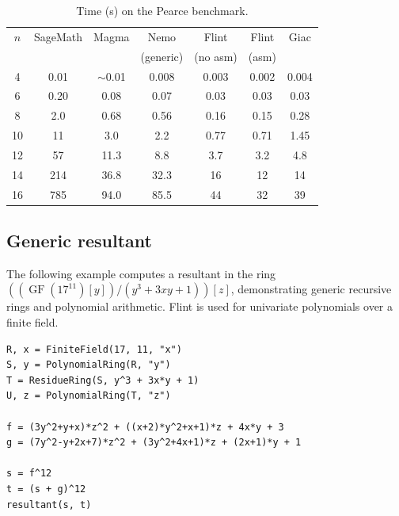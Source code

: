 \documentclass{sig-alternate-05-2015}
\begin{document}
\begin{table}
\center
\caption{Time (s) on the Pearce benchmark.}
\begin{small}
\setlength{\tabcolsep}{2.0pt}
\renewcommand{\arraystretch}{1.08}
\begin{tabular}{c c c c c c c} \hline
$n$ & SageMath & Magma & Nemo & Flint & Flint & Giac \\ 
    &          &       & (generic) & (no asm) & (asm) & \\ \hline
     4  &   0.01 & $\sim$0.01  &   0.008          & 0.003         &   0.002             &                     0.004 \\
     6  &   0.20  &   0.08   &     0.07        &     0.03       &       0.03         &                           0.03 \\
     8  &   2.0  &     0.68   &     0.56       &      0.16      &        0.15        &                            0.28 \\
    10  &   11   &     3.0    &       2.2      &       0.77     &         0.71       &                             1.45 \\
    12  &   57   &    11.3    &      8.8       &        3.7     &           3.2      &                                4.8 \\
    14  &  214   &   36.8     &   32.3         &       16       &         12         &                               14 \\
    16  &  785   &   94.0     &   85.5         &       44       &         32         &                               39 \\
\end{tabular}
\label{tab:pearce}
\end{small}
\end{table}

\subsection{Generic resultant}

The following example computes a resultant
in the ring $((\operatorname{GF}(17^{11})[y])/(y^3 + 3xy + 1))[z]$,
demonstrating generic recursive rings and polynomial
arithmetic. Flint is used for univariate polynomials over a finite field.

\begin{small}
\begin{verbatim}
R, x = FiniteField(17, 11, "x")
S, y = PolynomialRing(R, "y")
T = ResidueRing(S, y^3 + 3x*y + 1)
U, z = PolynomialRing(T, "z")

f = (3y^2+y+x)*z^2 + ((x+2)*y^2+x+1)*z + 4x*y + 3
g = (7y^2-y+2x+7)*z^2 + (3y^2+4x+1)*z + (2x+1)*y + 1

s = f^12
t = (s + g)^12
resultant(s, t)
\end{verbatim}
\end{small}
\end{document}
